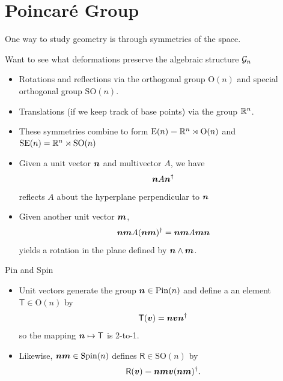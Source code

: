 \documentclass[UKenglish]{beamer}
\begin{document}
\section{Poincar\'e Group}

\begin{frame}{}
\vfill
One way to study geometry is through symmetries of the space.
\vfill
\end{frame}

\begin{frame}{}
\vfill
Want to see what deformations preserve the algebraic structure $\mathcal{G}_n$
\begin{itemize}
	\item Rotations and reflections via the orthogonal group $\mathrm{O}(n)$ and special orthogonal group $\mathrm{SO}(n)$.
	\item Translations (if we keep track of base points) via the group $\mathbb{R}^n$.
	\item These symmetries combine to form  $\mathrm{E}(n) = \mathbb{R}^n \rtimes \mathrm{O}(n)$ and  $\mathrm{SE}(n)=\mathbb{R}^n \rtimes \mathrm{SO}(n)$
\end{itemize}
\vfill
\end{frame}

\begin{frame}{}
\vfill
\begin{itemize}
	\item Given a unit vector $\boldsymbol{n}$ and multivector $A$, we have 
	\[
	\boldsymbol{n} A \boldsymbol{n}^\dagger
	\]
	 reflects $A$ about the hyperplane perpendicular to $\boldsymbol{n}$
	\item Given another unit vector $\boldsymbol{m}$, 
	\[
	\boldsymbol{nm}A(\boldsymbol{nm})^\dagger = \boldsymbol{nm}A \boldsymbol{mn}
	\]
	 yields a rotation in the plane defined by $\boldsymbol{n}\wedge \boldsymbol{m}$.
\end{itemize}
\vfill
\end{frame}

\begin{frame}{Pin and Spin}
\vfill
\begin{itemize}
	\item Unit vectors generate the group $\boldsymbol{n}\in \mathrm{Pin}(n)$ and define a an element $\mathsf{T}\in \mathrm{O}(n)$ by
	\[
	\mathsf{T}(\boldsymbol{v}) = \boldsymbol{n} \boldsymbol{v} \boldsymbol{n}^\dagger
	\]
	so the mapping $\boldsymbol{n}\mapsto \mathsf{T}$ is 2-to-1.
	\item Likewise, $\boldsymbol{nm} \in \mathrm{Spin}(n)$ defines $\mathsf{R} \in \mathrm{SO}(n)$ by
	\[
	\mathsf{R}(\boldsymbol{v}) = \boldsymbol{nm}\boldsymbol{v}(\boldsymbol{nm})^\dagger.
	\]
\end{itemize}
\vfill
\end{frame}
\end{document}
